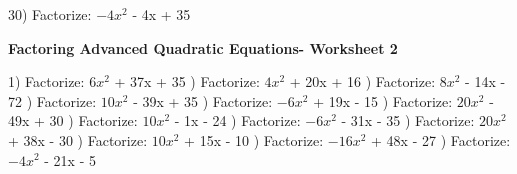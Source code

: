 \documentclass{article}%
\begin{document}
30) Factorize: $-4x^2$ - 4x + 35%
\newline%
\newline%
\newline%
\pagebreak%
\large%
\begin{center}%
\textbf{Factoring Advanced Quadratic Equations- Worksheet 2}%
\newline%
\newline%
\newline%
\end{center} \normalsize%
1) Factorize: $6x^2$ + 37x + 35%
\newline%
\newline%
) Factorize: $4x^2$ + 20x + 16%
\newline%
\newline%
) Factorize: $8x^2$ - 14x - 72%
\newline%
\newline%
) Factorize: $10x^2$ - 39x + 35%
\newline%
\newline%
) Factorize: $-6x^2$ + 19x - 15%
\newline%
\newline%
) Factorize: $20x^2$ - 49x + 30%
\newline%
\newline%
) Factorize: $10x^2$ - 1x - 24%
\newline%
\newline%
) Factorize: $-6x^2$ - 31x - 35%
\newline%
\newline%
) Factorize: $20x^2$ + 38x - 30%
\newline%
\newline%
) Factorize: $10x^2$ + 15x - 10%
\newline%
\newline%
) Factorize: $-16x^2$ + 48x - 27%
\newline%
\newline%
) Factorize: $-4x^2$ - 21x - 5%
\newline%
\end{document}

